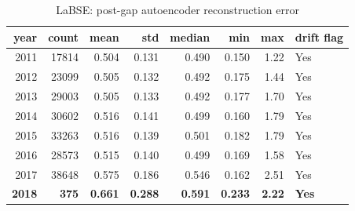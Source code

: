 \begin{table}[ht]
\centering
\caption{LaBSE: post-gap autoencoder reconstruction error}
\label{tab:labse_ae_yearly}
\begin{tabular}{rrrrrrrl}
\toprule
year & count & mean & std & median & min & max & drift flag \\
\midrule
2011 & 17814 & 0.504 & 0.131 & 0.490 & 0.150 & 1.22 & Yes \\
2012 & 23099 & 0.505 & 0.132 & 0.492 & 0.175 & 1.44 & Yes \\
2013 & 29003 & 0.505 & 0.133 & 0.492 & 0.177 & 1.70 & Yes \\
2014 & 30602 & 0.516 & 0.141 & 0.499 & 0.160 & 1.79 & Yes \\
2015 & 33263 & 0.516 & 0.139 & 0.501 & 0.182 & 1.79 & Yes \\
2016 & 28573 & 0.515 & 0.140 & 0.499 & 0.169 & 1.58 & Yes \\
2017 & 38648 & 0.575 & 0.186 & 0.546 & 0.162 & 2.51 & Yes \\
\textbf{2018} & \textbf{375} & \textbf{0.661} & \textbf{0.288} & \textbf{0.591} & \textbf{0.233} & \textbf{2.22} & \textbf{Yes} \\
\bottomrule
\end{tabular}
\end{table}
